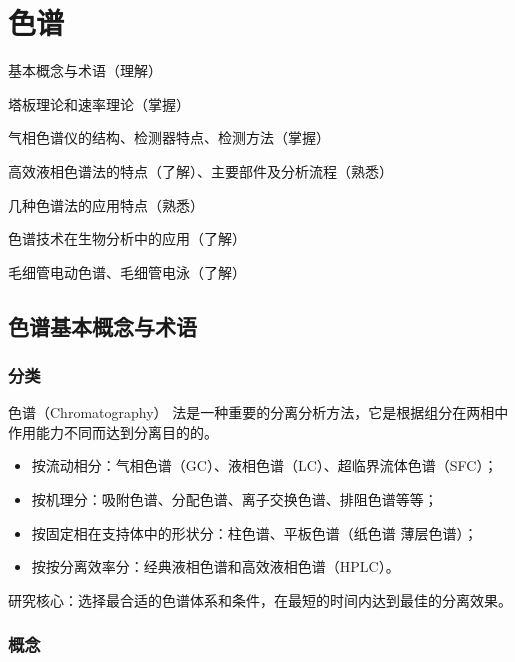 \chapter{色谱}

\begin{introduction}
	\item 基本概念与术语（理解）
	\item 塔板理论和速率理论（掌握）
	\item 气相色谱仪的结构、检测器特点、检测方法（掌握）
	\item 高效液相色谱法的特点（了解）、主要部件及分析流程（熟悉）
	\item 几种色谱法的应用特点（熟悉）
	\item 色谱技术在生物分析中的应用（了解）
	\item 毛细管电动色谱、毛细管电泳（了解）
\end{introduction}





\section{色谱基本概念与术语}

\subsection{分类}
色谱（Chromatography） 法是一种重要的分离分析方法，它是根据组分在两相中作用能力不同而达到分离目的的。
\begin{itemize}
	\item 按流动相分：气相色谱（GC）、液相色谱（LC）、超临界流体色谱（SFC）；
	\item 按机理分：吸附色谱、分配色谱、离子交换色谱、排阻色谱等等；
	\item 按固定相在支持体中的形状分：柱色谱、平板色谱（纸色谱 薄层色谱）；
	\item 按按分离效率分：经典液相色谱和高效液相色谱（HPLC）。
\end{itemize}

研究核心：选择最合适的色谱体系和条件，在最短的时间内达到最佳的分离效果。

\subsection{概念}

